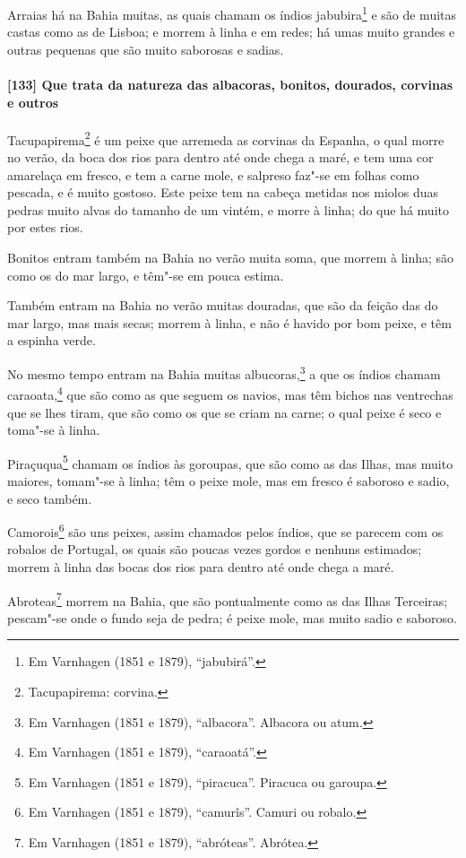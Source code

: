 Arraias há na Bahia muitas, as quais chamam os índios jabubira\footnote{ Em Varnhagen
(1851 e 1879), ``jabubirá''.} e são de muitas castas como as de Lisboa; e morrem à linha e
em redes; há umas muito grandes e outras pequenas que são muito saborosas e sadias.

\paragraph{[133] Que trata da natureza das albacoras, bonitos, dourados, corvinas e outros}\quad
Tacupapirema\footnote{ Tacupapirema: corvina.} é um peixe que arremeda as corvinas da
Espanha, o qual morre no verão, da boca dos rios para dentro até onde chega a maré, e tem
uma cor amarelaça em fresco, e tem a carne mole, e salpreso faz"-se em folhas como pescada,
e é muito gostoso. Este peixe tem na cabeça metidas nos miolos duas pedras muito alvas do
tamanho de um vintém, e morre à linha; do que há muito por estes rios.

Bonitos entram também na Bahia no verão muita soma, que morrem à linha; são como os do mar
largo, e têm"-se em pouca estima.

Também entram na Bahia no verão muitas douradas, que são da feição das do mar largo, mas
mais secas; morrem à linha, e não é havido por bom peixe, e têm a espinha verde.

No mesmo tempo entram na Bahia muitas albucoras,\footnote{ Em Varnhagen (1851 e 1879),
``albacora''. Albacora ou atum.} a que os índios chamam caraoata,\footnote{ Em Varnhagen
(1851 e 1879), ``caraoatá''.} que são como as que seguem os navios, mas têm bichos nas
ventrechas que se lhes tiram, que são como os que se criam na carne; o qual peixe é seco e
toma"-se à linha.

Piraçuqua\footnote{ Em Varnhagen (1851 e 1879), ``piracuca''. Piracuca ou garoupa.} chamam
os índios às goroupas, que são como as das Ilhas, mas muito maiores, tomam"-se à linha; têm
o peixe mole, mas em fresco é saboroso e sadio, e seco também.

Camorois\footnote{ Em Varnhagen (1851 e 1879), ``camurîs''. Camuri ou robalo.} são uns
peixes, assim chamados pelos índios, que se parecem com os robalos de Portugal, os quais
são poucas vezes gordos e nenhuns estimados; morrem à linha das bocas dos rios para dentro
até onde chega a maré.

Abroteas\footnote{ Em Varnhagen (1851 e 1879), ``abróteas''. Abrótea.} morrem na Bahia,
que são pontualmente como as das Ilhas Terceiras; pescam"-se onde o fundo seja de pedra; é
peixe mole, mas muito sadio e saboroso.

